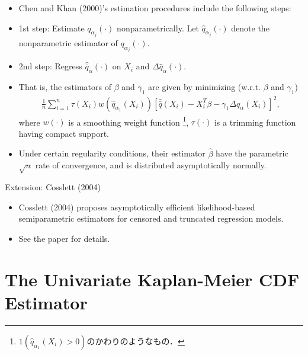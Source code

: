 \documentclass[xcolor=svgnames,dvipdfmx,cjk]{beamer}
\theoremstyle{example}
\begin{document}
\begin{frame}
      \begin{itemize}
            \item Chen and Khan (2000)'s estimation procedures include the following steps:
            \item \alert{1st step}: Estimate $q_{\alpha_j}(\cdot)$ nonparametrically. 
                  Let $\hat{q}_{\alpha_j}(\cdot)$ denote the nonparametric estimator of $q_{\alpha_j}(\cdot)$.
            \item \alert{2nd step}: Regress $\hat{\bar{q}}_{\alpha}(\cdot)$ on $X_i$ and $\Delta \hat{q}_{\alpha}(\cdot)$.
            \item That is, the estimators of $\beta$ and $\gamma_1$ are given by minimizing (w.r.t. $\beta$ and $\gamma_1$)
                  \begin{align*}
                        \frac{1}{n} 
                        \sum_{i=1}^n 
                        \tau(X_i) 
                        w\left( \hat{q}_{\alpha_1}(X_i) \right)
                        [ \hat{\bar{q}}(X_i) - X_i^T\beta - \gamma_1 \Delta \hat{q}_{\alpha}(X_i) ]^2 ,
                  \end{align*}
                  where $w(\cdot)$ is a smoothing weight function
                  \footnote{$1( \hat{q}_{\alpha_1}(X_i)>0)$のかわりのようなもの．},
                  $\tau(\cdot)$ is a trimming function having compact support.
            \item Under certain regularity conditions, 
                  their estimator $\hat{\beta}$ have the parametric $\sqrt{n}$ rate of convergence,
                  and is distributed asymptotically normally.
      \end{itemize}
\end{frame}

\begin{frame}{\alert{Extension}: Cosslett (2004)}
      \begin{itemize}
            \item Cosslett (2004) proposes asymptotically efficient likelihood-based semiparametric estimators 
                  for censored and truncated regression models.
            \item See the paper for details. 
      \end{itemize}
\end{frame}


\section{The Univariate Kaplan-Meier CDF Estimator}
\end{document}
